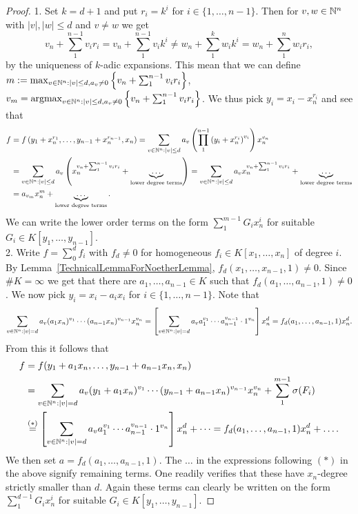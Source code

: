     \begin{proof}
    1. Set $k = d+1$ and put $r_i = k^i$ for $i\in\{1,\dots, n-1\}$. Then for $v,w\in \mathbb{N}^n$ with $\vert v\vert ,\vert w\vert \leq d$  and $v \neq w$ we get 
    $$v_n+\sum_1^{n-1} v_ir_i = v_n+\sum_1^{n-1} v_ik^i \neq w_n+\sum_1^k w_ik^i = w_n+\sum_1^n w_ir_i,$$
    by the uniqueness of $k$-adic expansions. This mean that we can define\\ $m:= \max_{v\in\mathbb{N}^n : \vert v\vert \leq d, a_v\neq 0} \left\{v_n + \sum_1^{n-1} v_i r_i\right\}$, $v_m = \text{argmax}_{v\in\mathbb{N}^n : \vert v\vert \leq d, a_v\neq 0} \left\{v_n + \sum_1^{n-1} v_i r_i\right\} $. We thus pick $y_i = x_i-x_n^{r_i}$ and see that 
    \begin{align*} 
        f &=f\left(y_1+x_n^{r_1},\dots, y_{n-1}+x_n^{r_{n-1}}, x_n\right) = \sum_{v\in \mathbb{N}^n : \vert v\vert \leq d} 
        a_v\left(\prod_1^{n-1}\left( y_i + x_n^{r_i}\right)^{v_i} \right) x_n^{v_n}\\ 
        &= \sum_{v\in \mathbb{N}^n : \vert v\vert \leq d} a_v\left(x_n^{v_n+\sum_1^{n-1} v_i r_i} + \underbrace{\dots}_{\text{lower degree terms}}\right)
        = \sum_{v\in \mathbb{N}^n : \vert v\vert \leq d} a_v x_n^{v_n+\sum_1^{n-1} v_i r_i} + \underbrace{\dots}_{\text{lower degree terms}}\\  &= a_{v_m}x_n^m + \underbrace{\dots}_{\text{lower degree terms}}.
    \end{align*}
    We can write the lower order terms on the form $\sum_1^{m-1} G_ix_n^i$ for suitable $G_i\in K[y_1,\dots,y_{n-1}]$.\\
    2. Write $f= \sum_0^d f_i$ with $f_d \neq 0$ for homogeneous $f_i\in K[x_1,\dots,x_n]$ of degree $i$. By Lemma~\ref{TechnicalLemmaForNoetherLemma}, $f_d(x_1,\dots,x_{n-1},1) \neq 0$. Since $\# K = \infty$ we get that there are $a_1,\dots, a_{n-1} \in K$ such that $f_d(a_1,\dots, a_{n-1},1) \neq 0$. We now pick $y_i = x_i-a_ix_i$ for $i\in\{1,\dots,n-1\}$. 
    Note that 
    $$\sum_{v\in \mathbb{N}^n : \vert v \vert = d} a_v(a_1x_n)^{v_1}\cdots (a_{n-1}x_n)^{v_{n-1}}x_n^{v_n} = \left[\sum_{v\in \mathbb{N}^n : \vert v \vert = d} a_va_1^{v_1}\cdots a_{n-1}^{v_{n-1}}\cdot1^{v_n}\right] x_n^d=f_d(a_1,\dots,a_{n-1},1)x_n^d. $$
    From this it follows that 
    \begin{align*}
        f &= f(y_1+a_1x_n,\dots,y_{n-1}+a_{n-1}x_n,x_n)\\
        &= \sum_{v\in \mathbb{N}^n : \vert v \vert = d} a_v(y_1+a_1x_n)^{v_1}\cdots (y_{n-1}+a_{n-1}x_n)^{v_{n-1}}x_n^{v_n} + \sum_1^{m-1}\sigma(F_i)\\
        &\overset{(\ast)}{=} \left[\sum_{v\in \mathbb{N}^n : \vert v\vert = d} a_va_1^{v_1}\cdots a_{n-1}^{v_{n-1}}\cdot 1^{v_n}\right]x_n^d + \dots=f_d(a_1,\dots,a_{n-1},1)x_n^d+\dots.
    \end{align*}
    We then set $a = f_d(a_1,\dots,a_{n-1},1)$. The $\dots$ in the expressions following $(\ast)$ in the above signify remaining terms. One readily verifies that these have $x_n$-degree strictly smaller than $d$. Again these terms can clearly be written on the form $\sum_1^{d-1}G_ix_n^i$ for suitable $G_i\in K[y_1,\dots,y_{n-1}]$. 
    \end{proof}
